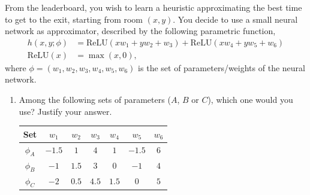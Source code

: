 \documentclass[11pt, a4paper]{article}
\begin{document}
From the leaderboard, you wish to learn a heuristic approximating the best time to get to the exit, starting from room $(x, y)$. You decide to use a small neural network as approximator, described by the following parametric function,
\begin{align*}
    h(x, y; \phi) & = \text{ReLU}(x w_1 + y w_2 + w_3) + \text{ReLU}(x w_4 + y w_5 + w_6) \\
    \text{ReLU}(x) & = \max(x, 0) ,
\end{align*}
where $\phi = (w_1, w_2, w_3, w_4, w_5, w_6)$ is the set of parameters/weights of the neural network.

\begin{enumerate}
    \item Among the following sets of parameters ($A$, $B$ or $C$), which one would you use? Justify your answer.

    \begin{table}[h]
        \centering
        \begin{tabular}{c|cccccc}
            \toprule
            Set & $w_1$ & $w_2$ & $w_3$ & $w_4$ & $w_5$ & $w_6$ \\
            \midrule
            $\phi_A$ &$-1.5$ & $1$ & $4$ & $1$ & $-1.5$ & $6$ \\
            $\phi_B$ &$-1$ & $1.5$ & $3$ & $0$ & $-1$ & $4$ \\
            $\phi_C$ &$-2$ & $0.5$ & $4.5$ & $1.5$ & $0$ & $5$ \\
            \bottomrule
        \end{tabular}
    \end{table}


\end{enumerate}
\end{document}
